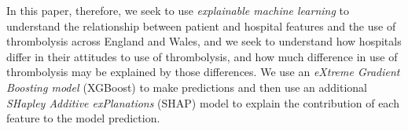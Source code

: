 
In this paper, therefore, we seek to use \emph{explainable machine learning} to understand the relationship between patient and hospital features and the use of thrombolysis across England and Wales, and we seek to understand how hospitals differ in their attitudes to use of thrombolysis, and how much difference in use of thrombolysis may be explained by those differences. We use an \emph{eXtreme Gradient Boosting model \cite{chen_xgboost_2016}} (XGBoost) to make predictions and then use an additional \emph{SHapley Additive exPlanations} \cite{lundberg_unified_2017} (SHAP) model to explain the contribution of each feature to the model prediction.